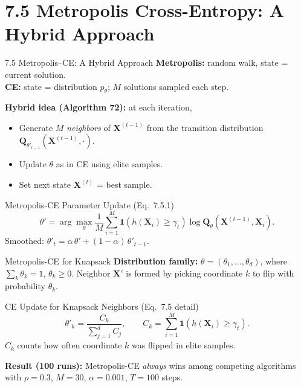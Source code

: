 \documentclass[aspectratio=169,10pt]{beamer}
\begin{document}
\section{7.5 Metropolis Cross-Entropy: A Hybrid Approach}

\begin{frame}{7.5 Metropolis--CE: A Hybrid Approach}
  \textbf{Metropolis:} random walk, state = current solution.\\
  \textbf{CE:} state = distribution $p_\theta$; $M$ solutions sampled each step.

  \medskip
  \textbf{Hybrid idea (Algorithm 72):} at each iteration,
  \begin{itemize}
    \item Generate $M$ \emph{neighbors} of $\mathbf{X}^{(t-1)}$ from the
      transition distribution $\mathbf{Q}_{\theta'_{t-1}}(\mathbf{X}^{(t-1)}, \cdot)$.
    \item Update $\theta$ as in CE using elite samples.
    \item Set next state $\mathbf{X}^{(t)}$ = best sample.
  \end{itemize}

  \begin{block}{Metropolis-CE Parameter Update (Eq.~7.5.1)}
    \[
      \theta' = \arg\max_\theta \frac{1}{M}
        \sum_{i=1}^M \mathbf{1}(h(\mathbf{X}_i) \ge \gamma_t)
        \log \mathbf{Q}_\theta(\mathbf{X}^{(t-1)}, \mathbf{X}_i).
    \]
    Smoothed: $\theta'_t = \alpha\,\theta' + (1-\alpha)\,\theta'_{t-1}$.
  \end{block}
\end{frame}

\begin{frame}{Metropolis-CE for Knapsack}
  \textbf{Distribution family:} $\theta = (\theta_1,\ldots,\theta_d)$,
  where $\sum_k \theta_k = 1$, $\theta_k \ge 0$.
  Neighbor $\mathbf{X}'$ is formed by picking coordinate $k$ to flip
  with probability $\theta_k$.

  \begin{block}{CE Update for Knapsack Neighbors (Eq.~7.5 detail)}
    \[
      \theta'_k = \frac{C_k}{\sum_{j=1}^d C_j}, \qquad
      C_k = \sum_{i=1}^M \mathbf{1}(h(\mathbf{X}_i) \ge \gamma_t).
    \]
    $C_k$ counts how often coordinate $k$ was flipped in elite samples.
  \end{block}

  \textbf{Result (100 runs):} Metropolis-CE \emph{always} wins among
  competing algorithms with $\rho=0.3$, $M=30$, $\alpha=0.001$,
  $T=100$ steps.
\end{frame}
\end{document}

